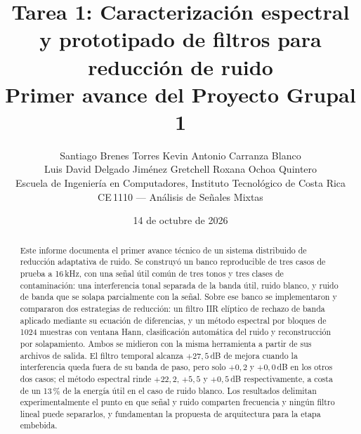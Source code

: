\documentclass[11pt,letterpaper]{article}
\title{\vspace{-1cm}\large\bfseries Tarea 1: Caracterización espectral y prototipado
de filtros para reducción de ruido\\[4pt]
\normalsize\mdseries Primer avance del Proyecto Grupal 1}
\author{%
\normalsize Santiago Brenes Torres \quad\textbullet\quad Kevin Antonio Carranza Blanco\\[2pt]
\normalsize Luis David Delgado Jiménez \quad\textbullet\quad Gretchell Roxana Ochoa Quintero\\[3pt]
\small Escuela de Ingeniería en Computadores, Instituto Tecnológico de Costa Rica\\[-1pt]
\small CE\,1110 --- Análisis de Señales Mixtas}
\date{\small 14 de octubre de 2026}
\begin{document}
\maketitle
\thispagestyle{empty}

\begin{abstract}
\noindent\small
Este informe documenta el primer avance técnico de un sistema distribuido de
reducción adaptativa de ruido. Se construyó un banco reproducible de tres casos de
prueba a 16\,kHz, con una señal útil común de tres tonos y tres clases de
contaminación: una interferencia tonal separada de la banda útil, ruido blanco, y
ruido de banda que se solapa parcialmente con la señal. Sobre ese banco se
implementaron y compararon dos estrategias de reducción: un filtro IIR elíptico de
rechazo de banda aplicado mediante su ecuación de diferencias, y un método
espectral por bloques de 1024 muestras con ventana Hann, clasificación automática
del ruido y reconstrucción por solapamiento. Ambos se midieron con la misma
herramienta a partir de sus archivos de salida. El filtro temporal alcanza
$+27{,}5$\,dB de mejora cuando la interferencia queda fuera de su banda de paso,
pero solo $+0{,}2$ y $+0{,}0$\,dB en los otros dos casos; el método espectral
rinde $+22{,}2$, $+5{,}5$ y $+0{,}5$\,dB respectivamente, a costa de un 13\,\% de
la energía útil en el caso de ruido blanco. Los resultados delimitan
experimentalmente el punto en que señal y ruido comparten frecuencia y ningún
filtro lineal puede separarlos, y fundamentan la propuesta de arquitectura para la
etapa embebida.
\end{abstract}

\vspace{0.3cm}










\end{document}
